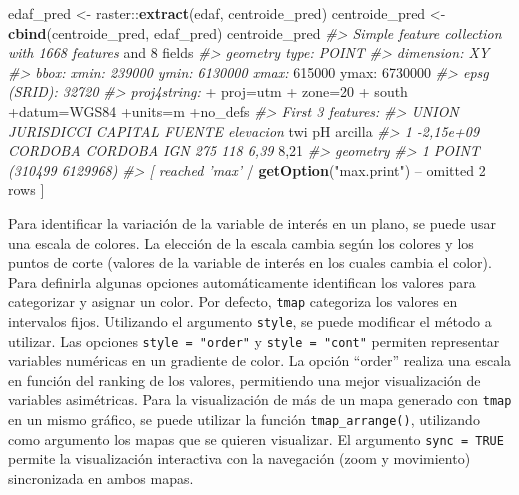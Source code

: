 \documentclass[11pt,b5paper,]{krantz}
\newenvironment{Shaded}{}{}
\newcommand{\CommentTok}[1]{\textcolor[rgb]{0.38,0.63,0.69}{\textit{#1}}}
\newcommand{\DecValTok}[1]{\textcolor[rgb]{0.25,0.63,0.44}{#1}}
\newcommand{\KeywordTok}[1]{\textcolor[rgb]{0.00,0.44,0.13}{\textbf{#1}}}
\newcommand{\NormalTok}[1]{#1}
\newcommand{\OperatorTok}[1]{\textcolor[rgb]{0.40,0.40,0.40}{#1}}
\newcommand{\StringTok}[1]{\textcolor[rgb]{0.25,0.44,0.63}{#1}}
\begin{document}
\begin{Shaded}
\begin{Highlighting}[]
\NormalTok{edaf_pred <-}\StringTok{ }\NormalTok{raster}\OperatorTok{::}\KeywordTok{extract}\NormalTok{(edaf, }
\NormalTok{                             centroide_pred)}
\NormalTok{centroide_pred <-}\StringTok{ }\KeywordTok{cbind}\NormalTok{(centroide_pred, }
\NormalTok{                        edaf_pred)}
\NormalTok{centroide_pred}
\CommentTok{#> Simple feature collection with 1668 features}
\NormalTok{and }\DecValTok{8}\NormalTok{ fields}
\CommentTok{#> geometry type: POINT}
\CommentTok{#> dimension: XY}
\CommentTok{#> bbox: xmin: 239000 ymin: 6130000 xmax:}
\DecValTok{615000}\NormalTok{ ymax}\OperatorTok{:}\StringTok{ }\DecValTok{6730000}
\CommentTok{#> epsg (SRID): 32720}
\CommentTok{#> proj4string: }
    \OperatorTok{+}\StringTok{ }\NormalTok{proj=utm }
    \OperatorTok{+}\StringTok{ }\NormalTok{zone=}\DecValTok{20} 
    \OperatorTok{+}\StringTok{ }\NormalTok{south}
\OperatorTok{+}\NormalTok{datum=WGS84 }\OperatorTok{+}\NormalTok{units=m }\OperatorTok{+}\NormalTok{no_defs}
\CommentTok{#> First 3 features:}
\CommentTok{#> UNION JURISDICCI CAPITAL FUENTE elevacion}
\NormalTok{twi pH arcilla}
\CommentTok{#> 1 -2,15e+09 CORDOBA CORDOBA IGN 275 118 6,39}
\DecValTok{8}\NormalTok{,}\DecValTok{21}
\CommentTok{#> geometry}
\CommentTok{#> 1 POINT (310499 6129968)}
\CommentTok{#> [ reached 'max'}
    \OperatorTok{/}\StringTok{ }\KeywordTok{getOption}\NormalTok{(}\StringTok{"max.print"}\NormalTok{) }\OperatorTok{--}
\NormalTok{omitted }\DecValTok{2}\NormalTok{ rows ]}
\end{Highlighting}
\end{Shaded}

Para identificar la variación de la variable de interés en un plano, se puede usar una escala de colores. La elección de la escala cambia según los colores y los puntos de corte (valores de la variable de interés en los cuales cambia el color). Para definirla algunas opciones automáticamente identifican los valores para categorizar y asignar un color. Por defecto, \texttt{tmap} categoriza los valores en intervalos fijos. Utilizando el argumento \texttt{style}, se puede modificar el método a utilizar. Las opciones \texttt{style\ =\ "order"} y \texttt{style\ =\ "cont"} permiten representar variables numéricas en un gradiente de color. La opción ``order'' realiza una escala en función del ranking de los valores, permitiendo una mejor visualización de variables asimétricas. Para la visualización de más de un mapa generado con \texttt{tmap} en un mismo gráfico, se puede utilizar la función \texttt{tmap\_arrange()}, utilizando como argumento los mapas que se quieren visualizar. El argumento \texttt{sync\ =\ TRUE} permite la visualización interactiva con la navegación (zoom y movimiento) sincronizada en ambos mapas.
\end{document}
